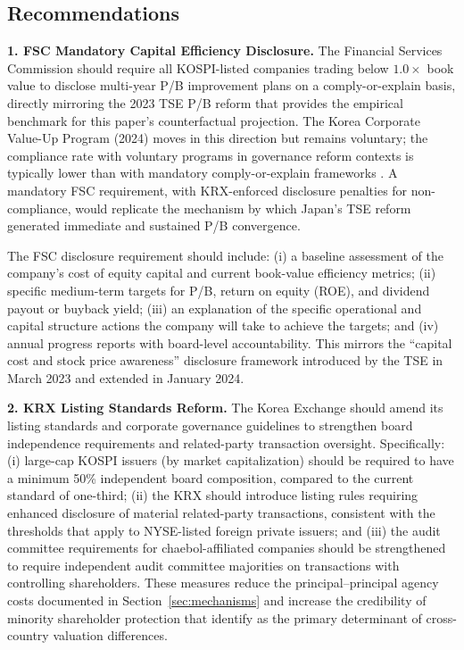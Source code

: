 \documentclass[12pt]{article}
\begin{document}
\subsection{Recommendations}

\textbf{1. FSC Mandatory Capital Efficiency Disclosure.} The Financial Services Commission
should require all KOSPI-listed companies trading below $1.0\times$ book value to disclose
multi-year P/B improvement plans on a comply-or-explain basis, directly mirroring the 2023
TSE P/B reform that provides the empirical benchmark for this paper's counterfactual
projection. The Korea Corporate Value-Up Program (2024) moves in this direction but remains
voluntary; the compliance rate with voluntary programs in governance reform contexts is
typically lower than with mandatory comply-or-explain frameworks \citep{kcmi2023}. A
mandatory FSC requirement, with KRX-enforced disclosure penalties for non-compliance, would
replicate the mechanism by which Japan's TSE reform generated immediate and sustained P/B
convergence.

The FSC disclosure requirement should include: (i) a baseline assessment of the company's
cost of equity capital and current book-value efficiency metrics; (ii) specific medium-term
targets for P/B, return on equity (ROE), and dividend payout or buyback yield; (iii) an
explanation of the specific operational and capital structure actions the company will take
to achieve the targets; and (iv) annual progress reports with board-level accountability.
This mirrors the ``capital cost and stock price awareness'' disclosure framework introduced
by the TSE in March 2023 and extended in January 2024.

\textbf{2. KRX Listing Standards Reform.} The Korea Exchange should amend its listing
standards and corporate governance guidelines to strengthen board independence requirements
and related-party transaction oversight. Specifically: (i) large-cap KOSPI issuers (by
market capitalization) should be required to have a minimum 50\% independent board
composition, compared to the current standard of one-third; (ii) the KRX should introduce
listing rules requiring enhanced disclosure of material related-party transactions,
consistent with the thresholds that apply to NYSE-listed foreign private issuers; and
(iii) the audit committee requirements for chaebol-affiliated companies should be strengthened
to require independent audit committee majorities on transactions with controlling
shareholders. These measures reduce the principal--principal agency costs documented in
Section~\ref{sec:mechanisms} and increase the credibility of minority shareholder protection
that \citet{porta1998, porta2002} identify as the primary determinant of cross-country
valuation differences.
\end{document}
